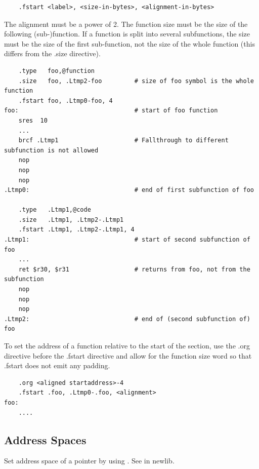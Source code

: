 \begin{verbatim}
    .fstart <label>, <size-in-bytes>, <alignment-in-bytes>
\end{verbatim}

The alignment must be a power of 2. The function size must be the size of the following (sub-)function.
If a function is split into several subfunctions, the size must be the size of the first sub-function,
not the size of the whole function (this differs from the .size directive).

\begin{verbatim}
    .type   foo,@function
    .size   foo, .Ltmp2-foo         # size of foo symbol is the whole function
    .fstart foo, .Ltmp0-foo, 4
foo:                                # start of foo function
    sres  10
    ...
    brcf .Ltmp1                     # Fallthrough to different subfunction is not allowed
    nop
    nop
    nop
.Ltmp0:                             # end of first subfunction of foo

    .type   .Ltmp1,@code
    .size   .Ltmp1, .Ltmp2-.Ltmp1
    .fstart .Ltmp1, .Ltmp2-.Ltmp1, 4
.Ltmp1:                             # start of second subfunction of foo
    ...
    ret $r30, $r31                  # returns from foo, not from the subfunction
    nop
    nop
    nop
.Ltmp2:                             # end of (second subfunction of) foo
\end{verbatim}

To set the address of a function relative to the start of the section, use the .org directive before
the .fstart directive and allow for the function size word so that .fstart does not emit any padding.

\begin{verbatim}
    .org <aligned startaddress>-4
    .fstart .foo, .Ltmp0-.foo, <alignment>
foo:
    ....
\end{verbatim}

\subsection{Address Spaces}

Set address space of a pointer by using . See  in newlib.

